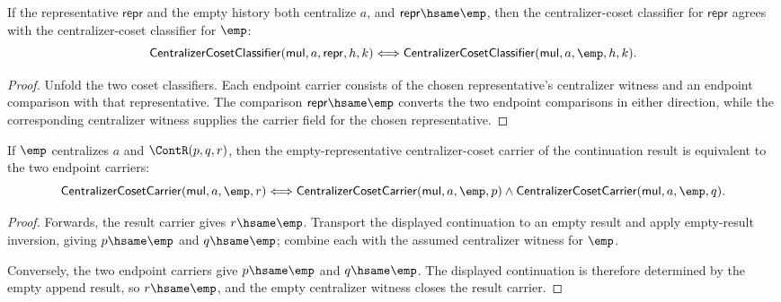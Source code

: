 \begin{theorem}
\label{thm:quotientgroup-centralizer-coset-empty-representative-transport}
If the representative $\mathsf{repr}$ and the empty history both centralize
$a$, and $\mathsf{repr}\hsame\emp$, then the centralizer-coset classifier for
$\mathsf{repr}$ agrees with the centralizer-coset classifier for $\emp$:
$$
\mathsf{CentralizerCosetClassifier}(\mathsf{mul},a,\mathsf{repr},h,k)
\Longleftrightarrow
\mathsf{CentralizerCosetClassifier}(\mathsf{mul},a,\emp,h,k).
$$
\end{theorem}
\begin{proof}
Unfold the two coset classifiers. Each endpoint carrier consists of the chosen
representative's centralizer witness and an endpoint comparison with that
representative. The comparison $\mathsf{repr}\hsame\emp$ converts the two
endpoint comparisons in either direction, while the corresponding centralizer
witness supplies the carrier field for the chosen representative.
\end{proof}

\begin{theorem}
\label{thm:quotientgroup-centralizer-coset-empty-continuation-pair}
If $\emp$ centralizes $a$ and $\ContR(p,q,r)$, then the empty-representative
centralizer-coset carrier of the continuation result is equivalent to the two
endpoint carriers:
$$
\mathsf{CentralizerCosetCarrier}(\mathsf{mul},a,\emp,r)
\Longleftrightarrow
\mathsf{CentralizerCosetCarrier}(\mathsf{mul},a,\emp,p)
\wedge
\mathsf{CentralizerCosetCarrier}(\mathsf{mul},a,\emp,q).
$$
\end{theorem}
\begin{proof}
Forwards, the result carrier gives $r\hsame\emp$. Transport the displayed
continuation to an empty result and apply empty-result inversion, giving
$p\hsame\emp$ and $q\hsame\emp$; combine each with the assumed centralizer
witness for $\emp$.

Conversely, the two endpoint carriers give $p\hsame\emp$ and $q\hsame\emp$.
The displayed continuation is therefore determined by the empty append result,
so $r\hsame\emp$, and the empty centralizer witness closes the result carrier.
\end{proof}

